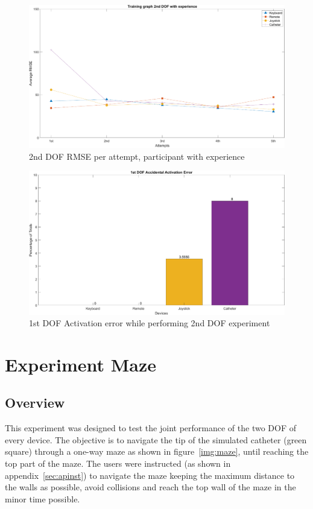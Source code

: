 \begin{figure}[ht]
   \centering
   \includegraphics[width=1.0\textwidth]{img/2nd/2ndTrainExp.png}
   \caption{2nd DOF RMSE per attempt, participant with experience}
   \label{img:2ndTrainExp}
\end{figure}

\begin{figure}[ht]
   \centering
   \includegraphics[width=1.0\textwidth]{img/2nd/2ndAct.png}
   \caption{1st DOF Activation error while performing 2nd DOF experiment}
   \label{img:2ndAct}
\end{figure}
\clearpage

\section{Experiment Maze}\label{sec:expmaze}
\subsection{Overview}\label{subsec:2ndover}
This experiment was designed to test the joint performance of the two DOF of every device. The objective is to navigate the tip of the simulated catheter (green square) through a one-way maze as shown in figure~\ref{img:maze}, until reaching the top part of the maze. The users were instructed (as shown in appendix~\ref{sec:apinst}) to navigate the maze keeping the maximum distance to the walls as possible, avoid collisions and reach the top wall of the maze in the minor time possible.\\

